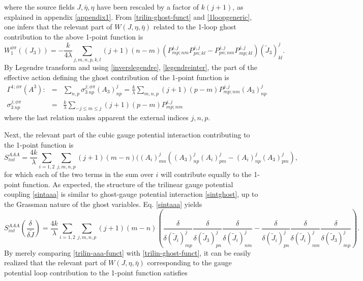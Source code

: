 \documentclass[11pt]{book}
\theoremstyle{break}
\begin{document}
where the source fields $J, \bar \eta, \eta$ have been rescaled by a factor of $k (j+1)$, as explained in appendix \ref{appendix1}.
From \eqref{trilin-ghost-funct} and \eqref{1loopgeneric}, one infers that the relevant part of $W(J,\eta,\bar\eta)$ related to the 1-loop ghost contribution to the above  1-point function is
\begin{equation}
W^{\phi\pi}_1((J_3))=-\frac{k}{4\lambda}\sum_{j,m,n,p,k,l}(j+1)(n-m)(P^{j,j}_{mp;nm}P^{j,j}_{pn;kl}-P^{j,j}_{pn;nm}P^{j,j}_{mp;kl})(\widetilde J_3)^j_{kl}\label{w1-ghost}.
\end{equation}
By Legendre transform and using \eqref{inverslegendre}, \eqref{legendreinter}, the part of the effective action defining the ghost contribution of the 1-point function is
\begin{eqnarray}
\Gamma^{1;\phi\pi}(A^3):&=&\sum_{n,p}\sigma^{j;\phi\pi}_{3\ np}(A_3)^j_{np}=\frac{k}{\lambda} \sum_{m,n,p} (j+1)(p-m)P^{j,j}_{mp;nm}(A_3)^j_{np}\nonumber\\
\sigma^{j;\phi\pi}_{3\ np}&=&\frac{k}{\lambda} \sum_{-j\le m\le j}(j+1)(p-m)P^{j,j}_{mp;nm}
\end{eqnarray}
where the last relation makes apparent the external indices $j,n,p$.\par 
Next, the relevant part of the cubic gauge potential interaction contributing to the 1-point function is
\begin{equation}
S_{int}^{AAA}=\frac{4 k}{\lambda}\sum_{i=1,2}\sum_{j,m,n,p}(j+1)(m-n)((A_i)^j_{mn}((A_3)^j_{np}(A_i)^j_{pm}-(A_i)^j_{np}(A_3)^j_{pm})\label{sintaaa},
\end{equation}
for which each of the two terms in the sum over $i$ will contribute equally to the 1-point function. As expected, the structure of the trilinear gauge potential coupling \eqref{sintaaa} is similar to ghost-gauge potential interaction \eqref{sintghost}, up to the Grassman nature of the ghost variables. Eq. \eqref{sintaaa} yields
\begin{equation}
S_{int}^{AAA}(\frac{\delta}{\delta \widetilde J})=\frac{4 k}{\lambda}\sum_{i=1,2}\sum_{j,m,n,p}(j+1) (m-n)(\frac{\delta}{\delta(\widetilde J_i)^j_{mp}}\frac{\delta}{\delta(\widetilde J_3)^j_{pn}}\frac{\delta}{\delta(\widetilde J_i)^j_{nm}}
-\frac{\delta}{\delta(\widetilde J_i)^j_{pn}}\frac{\delta}{\delta(\widetilde J_i)^j_{nm}}\frac{\delta}{\delta(\widetilde J_3)^j_{mp}})\label{trilin-aaa-funct}.
\end{equation}
By merely comparing \eqref{trilin-aaa-funct} with \eqref{trilin-ghost-funct}, it can be easily realized that the relevant part of $W(J,\eta,\bar\eta)$ corresponding to the gauge potential loop contribution to the 1-point function satisfies
\end{document}
